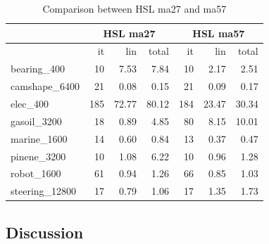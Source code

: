 \begin{table}
  \centering
  \begin{tabular}{|l|rrr|rrr|}
    \hline
  & \multicolumn{3}{c|}{\bf HSL ma27} & \multicolumn{3}{c|}{\bf HSL ma57} \\
  \hline
  & it & lin & total & it & lin & total \\
  \hline
    bearing\_400 & 10 & 7.53 & 7.84 & 10 & 2.17 & 2.51 \\
    camshape\_6400 & 21 & 0.08 & 0.15 & 21 & 0.09 & 0.17 \\
    elec\_400 & 185 & 72.77 & 80.12 & 184 & 23.47 & 30.34 \\
    gasoil\_3200 & 18 & 0.89 & 4.85 & 80 & 8.15 & 10.01 \\
    marine\_1600 & 14 & 0.60 & 0.84 & 13 & 0.37 & 0.47 \\
    pinene\_3200 & 10 & 1.08 & 6.22 & 10 & 0.96 & 1.28 \\
    robot\_1600 & 61 & 0.94 & 1.26 & 66 & 0.85 & 1.03 \\
    steering\_12800 & 17 & 0.79 & 1.06 & 17 & 1.35 & 1.73 \\
    \hline
  \end{tabular}
  \caption{Comparison between HSL ma27 and ma57}
\end{table}



\subsection{Discussion}

